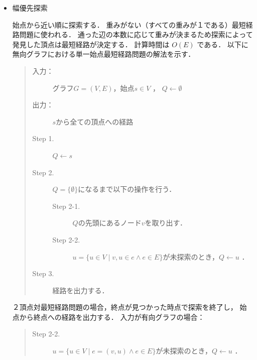 \documentclass[12pt]{optlab-bachelor}
\begin{document}
\begin{itemize}
  \item 幅優先探索

  始点から近い順に探索する．
  重みがない（すべての重みが１である）最短経路問題に使われる．
  通った辺の本数に応じて重みが決まるため探索によって発見した頂点は最短経路が決定する．
  計算時間は $O(E)$ である．
  以下に無向グラフにおける単一始点最短経路問題の解法を示す．

  \begin{quote}
    \begin{description}
      \item[入力：] グラフ$G=(V,E)$，始点$s \in V$ ， $Q \leftarrow \emptyset$
      \item[出力：] $s$から全ての頂点への経路
      \item[Step 1.] $Q \leftarrow s$
      \item[Step 2.] $Q = \{\emptyset\}$になるまで以下の操作を行う．
      \begin{description}
        \item[Step 2-1.] $Q$の先頭にあるノード$v$を取り出す．
        \item[Step 2-2.] $u = \{u \in V \mid v,u \in e \land e \in E\}$が未探索のとき，$Q \leftarrow u$ ．
      \end{description}

      \item[Step 3.] 経路を出力する．
    \end{description}
  \end{quote}
  ２頂点対最短経路問題の場合，終点が見つかった時点で探索を終了し，
  始点から終点への経路を出力する．
  入力が有向グラフの場合：
  \begin{quote}
    \begin{description}
      \item[Step 2-2.] $u = \{u \in V \mid e = (v,u) \land e \in E\}$が未探索のとき，$Q \leftarrow u$ ．
    \end{description}
  \end{quote}
\end{itemize}
\end{document}
